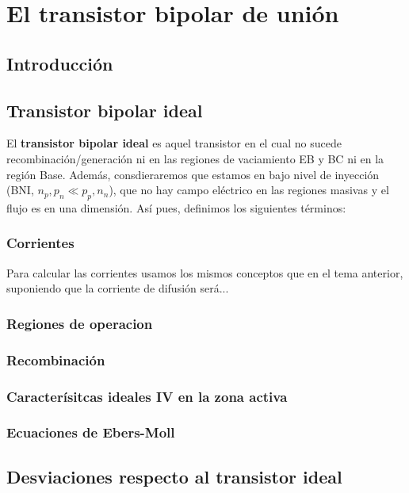 
\chapter{El transistor bipolar de unión}


\section{Introducción}


\section{Transistor bipolar ideal}

El \textbf{transistor bipolar ideal} es aquel transistor en el cual no sucede recombinación/generación ni en las regiones de vaciamiento EB y BC ni en la región Base. Además, consdieraremos que estamos en bajo nivel de inyección (BNI, $n_p, p_n \ll p_p,n_n$), que no hay campo eléctrico en las regiones masivas y el flujo es en una dimensión. Así pues, definimos los siguientes términos: 


\subsection{Corrientes}

Para calcular las corrientes usamos los mismos conceptos que en el tema anterior, suponiendo que la corriente de difusión será...

\subsection{Regiones de operacion}

\subsection{Recombinación}

\subsection{Caracterísitcas ideales IV en la zona activa}

\subsection{Ecuaciones de Ebers-Moll}


\section{Desviaciones respecto al transistor ideal}
